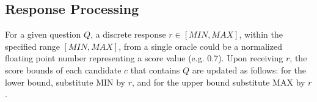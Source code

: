 \subsection{Response Processing}\label{subsec:resp}
For a given question $Q$, a discrete response \(r \in [MIN,MAX] \), within the specified range \([MIN, MAX]\), from a single oracle could be a normalized floating point number representing a score value (e.g. 0.7). Upon receiving $r$, the score bounds of each candidate $c$ that contains $Q$ are updated as follows: for the lower bound, substitute MIN  by $r$, and for the upper bound substitute MAX by $r$. 